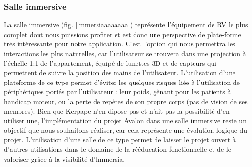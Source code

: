 \subsubsection{Salle immersive}
La salle immersive (fig. \ref{immersiaaaaaaaa}) représente l'équipement de RV le plus complet dont nous puissions profiter et est donc une perspective de plate-forme très intéressante pour notre application.
C'est l'option qui nous permettra les interactions les plus naturelles, car l'utilisateur se trouvera dans une projection à l'échelle 1:1 de l'appartement, équipé de lunettes 3D et de capteurs qui permettent de suivre la position des mains de l'utilisateur. \newline
L'utilisation d'une plateforme de ce type permet d'éviter les quelques risques liée à l'utilisation de périphériques portés par l'utilisateur : leur poids, gênant pour les patients à handicap moteur, ou la perte de repères de son propre corps (pas de vision de ses membres).
Bien que Kerpape n'en dipose pas et n'ait pas la possibilité d'en utiliser une, l'implémentation du projet Avalon dans une salle immersive reste un objectif que nous souhaitons réaliser, car cela représente une évolution logique du projet.
L'utilisation d'une salle de ce type permet de laisser le projet ouvert à d'autres utilisations dans le domaine de la rééducation fonctionnelle et de le valoriser grâce à la visibilité d'Immersia.
